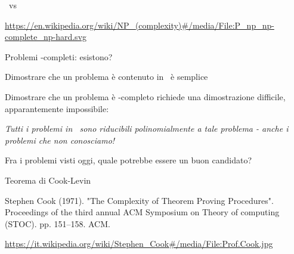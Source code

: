 \begin{frame}{\PTIME\ vs \NP}

\vspace{-6pt}

\tiny
\url{https://en.wikipedia.org/wiki/NP\_(complexity)\#/media/File:P\_np\_np-complete\_np-hard.svg}

\end{frame}

\begin{frame}{Problemi \NP-completi: esistono?}

\vspace{-9pt}
\BIL
\item Dimostrare che un problema è contenuto in \NP\ è semplice
\item Dimostrare che un problema è \NP-completo richiede una dimostrazione difficile, apparantemente impossibile:

\bigskip
\emph{Tutti i problemi in \NP\ sono riducibili polinomialmente a tale problema - anche i problemi che non conosciamo!}
\EIL

\bigskip
Fra i problemi visti oggi, quale potrebbe essere un buon candidato?

\end{frame}

\begin{frame}{Teorema di Cook-Levin}

\vspace{-9pt}
\begin{myboxtitle}[Bibliografia]
Stephen Cook (1971). "The Complexity of Theorem Proving Procedures". Proceedings of the third annual ACM Symposium on Theory of computing (STOC). pp. 151–158. ACM.
\end{myboxtitle}

\vspace{-6pt}

\tiny
\url{https://it.wikipedia.org/wiki/Stephen\_Cook\#/media/File:Prof.Cook.jpg}

\end{frame}

